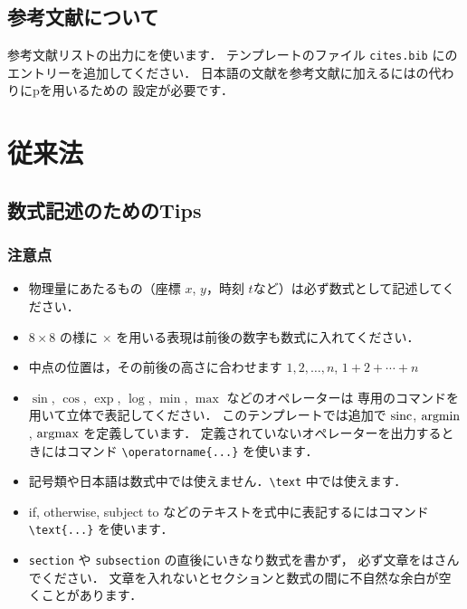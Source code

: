 \documentclass[dvipdfmx,disablejfam,nosetpagesize,12pt]{jsbook}
\begin{document}
\section{参考文献について}
参考文献リストの出力に\BibTeX を使います．
テンプレートのファイル \verb+cites.bib+ に\BibTeX のエントリーを追加してください．
日本語の文献を参考文献に加えるには\BibTeX の代わりにp\BibTeX を用いるための
設定が必要です．

\chapter{従来法} \label{Chap.previous}
\section{数式記述のためのTips}

\subsection{注意点}
\begin{itemize}
   \item 物理量にあたるもの（座標 $x$, $y$，時刻 $t$など）は必ず数式として記述してください．
   \item $8\times8$ の様に $\times$ を用いる表現は前後の数字も数式に入れてください．
   \item 中点の位置は，その前後の高さに合わせます %
         $1,2,\ldots,n$,
         $1+2+\cdots+n$
   \item $\sin$, $\cos$, $\exp$, $\log$, $\min$, $\max$ などのオペレーターは
         専用のコマンドを用いて立体で表記してください．
         このテンプレートでは追加で $\operatorname*{sinc}$, $\operatorname*{argmin}$, $\operatorname*{argmax}$ を定義しています．
         定義されていないオペレーターを出力するときにはコマンド \verb+\operatorname{...}+ を使います．
   \item 記号類や日本語は数式中では使えません．\verb+\text+ 中では使えます．
   \item if, otherwise, subject to などのテキストを式中に表記するにはコマンド \verb+\text{...}+ を使います．
   \item \verb+section+ や \verb+subsection+ の直後にいきなり数式を書かず，
         必ず文章をはさんでください．
         文章を入れないとセクションと数式の間に不自然な余白が空くことがあります．
\end{itemize}
\end{document}
